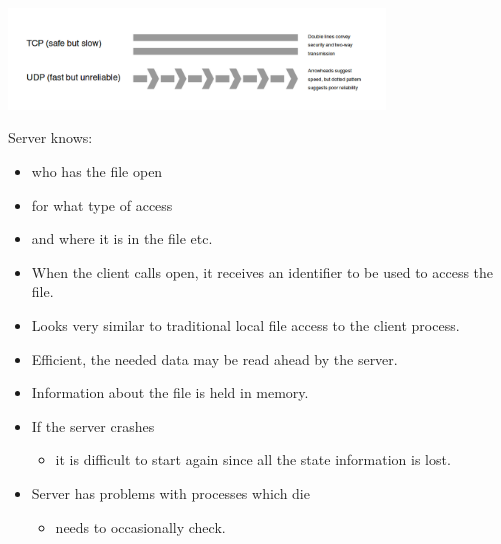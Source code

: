 \begin{slide}


    \includegraphics[width=100mm]{tcp-udp-2.png}

\end{slide}
    
\begin{slide}


    Server knows:
    \begin{itemize}
        \item who has the file open
        \item for what type of access
        \item and where it is in the file etc.
        \item When the client calls open, it receives an identifier to be used to access the file.
        \item Looks very similar to traditional local file access to the client process.
        \item Efficient, the needed data may be read ahead by the server.
        \item Information about the file is held in memory.
        \item If the server crashes
        \begin{itemize}
            \item it is difficult to start again since all the state information is lost.
        \end{itemize}
        \item Server has problems with processes which die
        \begin{itemize}
            \item needs to occasionally check.
        \end{itemize}
    \end{itemize}

\end{slide}

